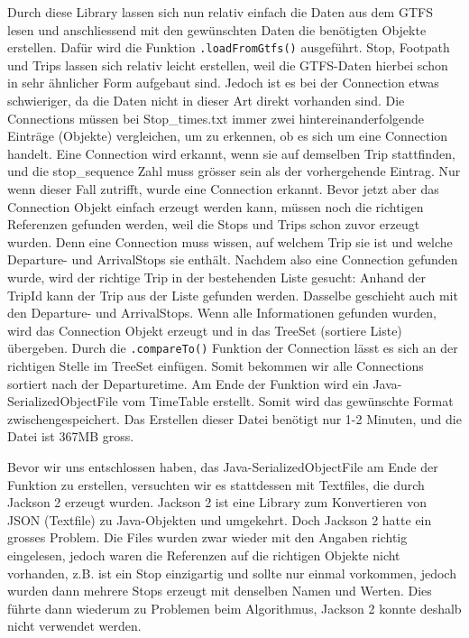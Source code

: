 Durch diese Library lassen sich nun relativ einfach die Daten aus dem GTFS lesen und anschliessend mit den gewünschten Daten die benötigten Objekte erstellen. Dafür wird die Funktion \texttt{.loadFromGtfs()} ausgeführt.  Stop, Footpath und Trips lassen sich relativ leicht erstellen, weil die GTFS-Daten hierbei schon in sehr ähnlicher Form aufgebaut sind. Jedoch ist es bei der Connection etwas schwieriger, da die Daten nicht in dieser Art direkt vorhanden sind. Die Connections müssen bei Stop\_times.txt immer zwei hintereinanderfolgende Einträge (Objekte) vergleichen, um zu erkennen, ob es sich um eine Connection handelt. Eine Connection wird erkannt, wenn sie auf demselben Trip stattfinden, und die stop\_sequence Zahl muss grösser sein als der vorhergehende Eintrag. Nur wenn dieser Fall zutrifft, wurde eine Connection erkannt. Bevor jetzt aber das Connection Objekt einfach erzeugt werden kann, müssen noch die richtigen Referenzen gefunden werden, weil die Stops und Trips schon zuvor erzeugt wurden. Denn eine Connection muss wissen, auf welchem Trip sie ist und welche Departure- und ArrivalStops sie enthält. Nachdem also eine Connection gefunden wurde, wird der richtige Trip in der bestehenden Liste gesucht: Anhand der TripId kann der Trip aus der Liste gefunden werden. Dasselbe geschieht auch mit den Departure- und ArrivalStops. Wenn alle Informationen gefunden wurden, wird das Connection Objekt erzeugt und in das TreeSet (sortiere Liste) übergeben. Durch die \texttt{.compareTo()} Funktion der Connection lässt es sich an der richtigen Stelle im TreeSet einfügen. Somit bekommen wir alle Connections sortiert nach der Departuretime. Am Ende der Funktion wird ein Java-SerializedObjectFile vom TimeTable erstellt. Somit wird das gewünschte Format zwischengespeichert. Das Erstellen dieser Datei benötigt nur 1-2 Minuten, und die Datei ist 367MB gross.\newline

Bevor wir uns entschlossen haben, das Java-SerializedObjectFile am Ende der Funktion zu erstellen, versuchten wir es stattdessen mit Textfiles, die durch Jackson 2 erzeugt wurden. Jackson 2 ist eine Library zum Konvertieren von JSON (Textfile) zu Java-Objekten und umgekehrt. Doch Jackson 2 hatte ein grosses Problem. Die Files wurden zwar wieder mit den Angaben richtig eingelesen, jedoch waren die Referenzen auf die richtigen Objekte nicht vorhanden, z.B. ist ein Stop einzigartig und sollte nur einmal vorkommen, jedoch wurden dann mehrere Stops erzeugt mit denselben Namen und Werten. Dies führte dann wiederum zu Problemen beim Algorithmus, Jackson 2 konnte deshalb nicht verwendet werden. \newline

